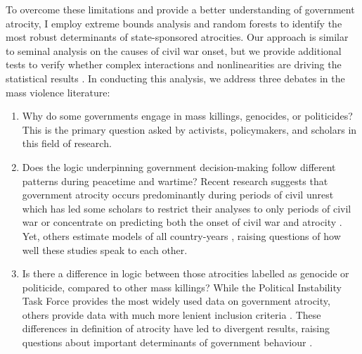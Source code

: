 \documentclass[a4paper,12pt]{article}
\begin{document}
To overcome these limitations and provide a better understanding of government atrocity, I employ extreme bounds analysis and random forests to identify the most robust determinants of state-sponsored atrocities. Our approach is similar to \cite{hegre2006sensitivity} seminal analysis on the causes of civil war onset, but we provide additional tests to verify whether complex interactions and nonlinearities are driving the statistical results \citep{bell2015examining,jones2015exploratory,jones2018there,muchlinski2015comparing}. In conducting this analysis, we address three debates in the mass violence literature:
	
\begin{enumerate}
 \item Why do some governments engage in mass killings, genocides, or politicides? This is the primary question asked by activists, policymakers, and scholars in this field of research. 
 \item Does the logic underpinning government decision-making follow different patterns during peacetime and wartime? Recent research suggests that government atrocity occurs predominantly during periods of civil unrest \citep{harff2003no} which has led some scholars to restrict their analyses to only periods of civil war \citep[e.g.,][]{colaresi2008kill, valentino2004draining} or concentrate on predicting both the onset of civil war and atrocity \citep{goldsmith2013forecasting}. Yet, others estimate models of all country-years \citep[e.g.,][]{krain1997state, montalvo2008discrete}, raising questions of how well these studies speak to each other.
 \item Is there a difference in logic between those atrocities labelled as genocide or politicide, compared to other mass killings? While the Political Instability Task Force \citep{marshall2017pitf} provides the most widely used data on government atrocity, others provide data with much more lenient inclusion criteria \citep[e.g.,][]{stanton2015regulating, ulfelder2012forecasting}. These differences in definition of atrocity have led to divergent results, raising questions about important determinants of government behaviour \citep[for discussion, see][]{straus2007second, uzonyi2016domestic, wayman2010explaining}.
\end{enumerate}
\end{document}
